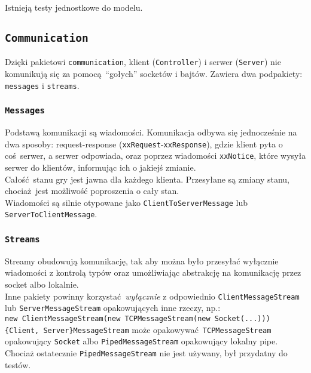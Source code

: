 \documentclass{article}
\newcommand{\ch}[1]{\texttt{#1}}
\begin{document}
Istnieją testy jednostkowe do modelu.

\subsection{\ch{Communication}}

Dzięki pakietowi \ch{communication}, klient (\ch{Controller}) i serwer (\ch{Server}) nie komunikują się za pomocą \enquote{gołych} socketów i bajtów. Zawiera dwa podpakiety: \ch{messages} i \ch{streams}.

\subsubsection{\ch{Messages}}

Podstawą komunikacji są wiadomości. Komunikacja odbywa się jednocześnie na dwa sposoby: request-response (\ch{xxRequest}-\ch{xxResponse}), gdzie klient pyta o coś serwer, a serwer odpowiada, oraz poprzez wiadomości \ch{xxNotice}, które wysyła serwer do klientów, informując ich o jakiejś zmianie.\\
Całość stanu gry jest jawna dla każdego klienta. Przesyłane są zmiany stanu, chociaż jest możliwość poproszenia o cały stan.\\

Wiadomości są silnie otypowane jako \ch{ClientToServerMessage} lub \ch{ServerToClientMessage}.

\subsubsection{\ch{Streams}}

Streamy obudowują komunikację, tak aby można było przesyłać wyłącznie wiadomości z kontrolą typów oraz umożliwiając abstrakcję na komunikację przez socket albo lokalnie.\\

Inne pakiety powinny korzystać \textit{wyłącznie} z odpowiednio \ch{ClientMessageStream} lub \ch{ServerMessageStream} opakowujących inne rzeczy, np.:\\
\ch{new ClientMessageStream(new TCPMessageStream(new Socket(...)))}\\

\ch{\{Client, Server\}MessageStream} może opakowywać \ch{TCPMessageStream} opakowujący \ch{Socket} albo \ch{PipedMessageStream} opakowujący lokalny pipe. Chociaż ostatecznie \ch{PipedMessageStream} nie jest używany, był przydatny do testów.\\
\end{document}
